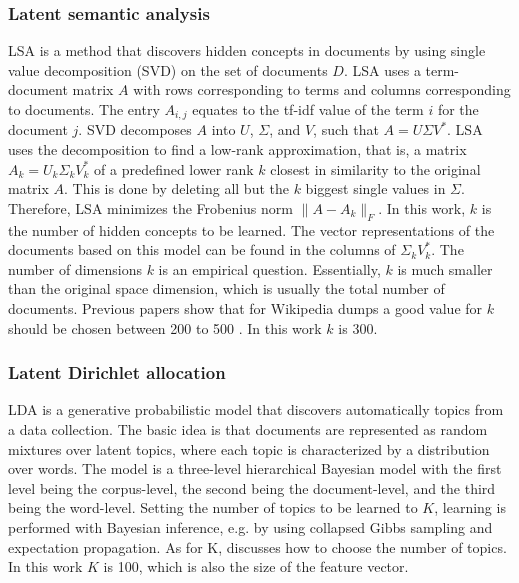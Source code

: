 \documentclass[a4paper]{article}
\begin{document}
\subsubsection{Latent semantic analysis}
LSA \cite{deerwester1990indexing} is a method that discovers hidden concepts in documents by using single value decomposition (SVD) on the set of documents $D$.
LSA uses a term-document matrix $A$ with rows corresponding to terms and columns corresponding to documents. The entry $A_{i,j}$ equates to the tf-idf value of the term $i$ for the document $j$. SVD decomposes $A$ into $U$, $\Sigma$, and $V$, such that $A = U \Sigma V^*$.
LSA uses the decomposition to find a low-rank approximation, that is, a matrix $A_k = U_k \Sigma_k V_k^*$ of a predefined lower rank $k$ closest in similarity to the original matrix $A$. This is done by deleting all but the $k$ biggest single values in $\Sigma$.
Therefore, LSA minimizes the Frobenius norm $\|A-A_k\|_F$. In this work, $k$ is the number of hidden concepts to be learned. The vector representations of the documents based on this model can be found in the columns of $\Sigma_k V_k^*$.
The number of dimensions $k$ is an empirical question. Essentially, $k$ is much smaller than the original space dimension, which is usually the total number of documents. Previous papers show that for Wikipedia dumps a good value for $k$ should be chosen between 200 to 500 \cite{bradford2008empirical}. In this work $k$ is 300.


\subsubsection{Latent Dirichlet allocation}
LDA \cite{blei2003latent} is a generative probabilistic model that discovers automatically topics from a data collection.
The basic idea is that documents are represented as random mixtures over latent topics, where each topic is characterized by a distribution over words. The model is a three-level hierarchical Bayesian model with the first level being the corpus-level, the second being the document-level, and the third being the word-level. Setting the number of topics to be learned to $K$, learning is performed with Bayesian inference, e.g. by using collapsed Gibbs sampling and expectation propagation. As for K, \cite{hoffman2010online} discusses how to choose the number of topics. In this work $K$ is 100, which is also the size of the feature vector.
\end{document}

